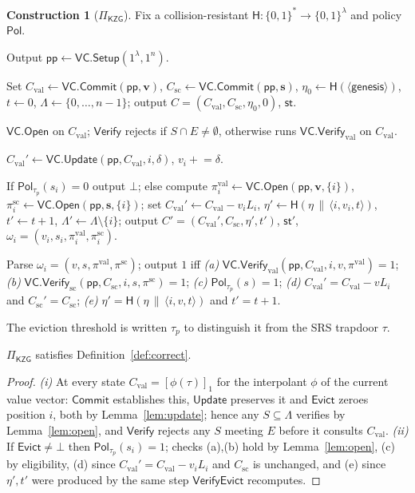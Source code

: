 \documentclass[version=submission]{iacrcc}
\theoremstyle{definition}
\newtheorem{construction}{Construction}[section]
\newcommand{\secpar}{\lambda}
\newcommand{\bit}{\{0,1\}}
\newcommand{\concat}{\,\|\,}
\newcommand{\Setup}{\mathsf{Setup}}
\newcommand{\Commit}{\mathsf{Commit}}
\newcommand{\Open}{\mathsf{Open}}
\newcommand{\Vfy}{\mathsf{Verify}}
\newcommand{\Update}{\mathsf{Update}}
\newcommand{\Evict}{\mathsf{Evict}}
\newcommand{\VfyEvict}{\mathsf{VerifyEvict}}
\newcommand{\pp}{\mathsf{pp}}
\newcommand{\aux}{\mathsf{st}}
\newcommand{\Pol}{\mathsf{Pol}}
\newcommand{\Val}{\mathrm{val}}
\newcommand{\Sc}{\mathrm{sc}}
\newcommand{\Cval}{C_{\Val}}
\newcommand{\Csc}{C_{\Sc}}
\newcommand{\Live}{\Lambda}
\newcommand{\Evicted}{E}
\newcommand{\hash}{\mathsf{H}}
\newcommand{\VC}{\mathsf{VC}}
\newcommand{\gone}[1]{\left[#1\right]_{1}}
\begin{document}
\begin{construction}[$\Pi_{\mathsf{KZG}}$]\label{con:evictvc}
Fix a collision-resistant $\hash:\bit^{*}\to\bit^{\secpar}$ and policy $\Pol$.
\begin{description}[leftmargin=0em,itemsep=4pt]
\item[$\Setup(1^\secpar,1^{n})$.] Output $\pp\leftarrow\VC.\Setup(1^\secpar,1^{n})$.
\item[$\Commit(\pp,\mathbf{v},\mathbf{s})$.] Set
      $\Cval\leftarrow\VC.\Commit(\pp,\mathbf{v})$,
      $\Csc\leftarrow\VC.\Commit(\pp,\mathbf{s})$,
      $\eta_0\leftarrow\hash(\langle\textsf{genesis}\rangle)$, $t\leftarrow0$,
      $\Live\leftarrow\{0,\dots,n-1\}$; output $C=(\Cval,\Csc,\eta_0,0)$, $\aux$.
\item[$\Open/\Vfy$.] $\VC.\Open$ on $\Cval$; $\Vfy$ rejects if
      $S\cap\Evicted\neq\emptyset$, otherwise runs $\VC.\Vfy_{\Val}$ on $\Cval$.
\item[$\Update(\pp,\aux,i,\delta)$.]
      $\Cval'\leftarrow\VC.\Update(\pp,\Cval,i,\delta)$, $v_i\mathrel{+}=\delta$.
\item[$\Evict(\pp,\aux,i,\tau_{\!p})$.] If $\Pol_{\tau_{\!p}}(s_i)=0$ output
      $\bot$; else compute $\pi_i^{\Val}\leftarrow\VC.\Open(\pp,\mathbf{v},\{i\})$,
      $\pi_i^{\Sc}\leftarrow\VC.\Open(\pp,\mathbf{s},\{i\})$; set
      $\Cval'\leftarrow\Cval-v_i L_i$,
      $\eta'\leftarrow\hash(\eta\concat\langle i,v_i,t\rangle)$, $t'\leftarrow t+1$,
      $\Live'\leftarrow\Live\setminus\{i\}$; output $C'=(\Cval',\Csc,\eta',t')$,
      $\aux'$, $\omega_i=(v_i,s_i,\pi_i^{\Val},\pi_i^{\Sc})$.
\item[$\VfyEvict(\pp,C,i,\tau_{\!p},\omega_i,C')$.] Parse
      $\omega_i=(v,s,\pi^{\Val},\pi^{\Sc})$; output $1$ iff
      \emph{(a)} $\VC.\Vfy_{\Val}(\pp,\Cval,i,v,\pi^{\Val})=1$;
      \emph{(b)} $\VC.\Vfy_{\Sc}(\pp,\Csc,i,s,\pi^{\Sc})=1$;
      \emph{(c)} $\Pol_{\tau_{\!p}}(s)=1$;
      \emph{(d)} $\Cval'=\Cval-v L_i$ and $\Csc'=\Csc$;
      \emph{(e)} $\eta'=\hash(\eta\concat\langle i,v,t\rangle)$ and $t'=t+1$.
\end{description}
\end{construction}

\noindent The eviction threshold is written $\tau_{\!p}$ to distinguish it from
the SRS trapdoor $\tau$.

\begin{theorem}[Correctness]\label{thm:correct}
$\Pi_{\mathsf{KZG}}$ satisfies Definition~\ref{def:correct}.
\end{theorem}
\begin{proof}
\emph{(i)} At every state $\Cval=\gone{\phi(\tau)}$ for the interpolant $\phi$ of
the current value vector: $\Commit$ establishes this, $\Update$ preserves it and
$\Evict$ zeroes position $i$, both by Lemma~\ref{lem:update}; hence any
$S\subseteq\Live$ verifies by Lemma~\ref{lem:open}, and $\Vfy$ rejects any $S$
meeting $\Evicted$ before it consults $\Cval$. \emph{(ii)} If
$\Evict\neq\bot$ then $\Pol_{\tau_{\!p}}(s_i)=1$; checks (a),(b) hold by
Lemma~\ref{lem:open}, (c) by eligibility, (d) since $\Cval'=\Cval-v_iL_i$ and
$\Csc$ is unchanged, and (e) since $\eta',t'$ were produced by the same step
$\VfyEvict$ recomputes.
\end{proof}
\end{document}
